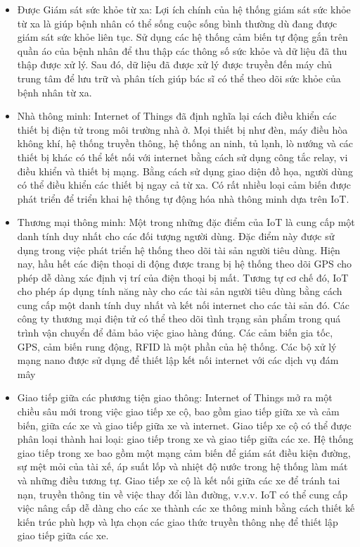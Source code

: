 \documentclass{article} %
\begin{document}
	\begin{itemize}
		\item Được Giám sát sức khỏe từ xa: Lợi ích chính của hệ thống giám sát sức khỏe từ xa là giúp bệnh nhân có thể sống cuộc sống bình thường dù đang được giám sát sức khỏe liên tục. Sử dụng các hệ thống cảm biến tự động gắn trên quần áo của bệnh nhân để thu thập các thông số sức khỏe và dữ liệu đã thu thập được xử lý. Sau đó, dữ liệu đã được xử lý được truyền đến máy chủ trung tâm để lưu trữ và phân tích giúp bác sĩ có thể theo dõi sức khỏe của bệnh nhân từ xa.
		\item Nhà thông minh: Internet of Things đã định nghĩa lại cách điều khiển các thiết bị điện tử trong môi trường nhà ở. Mọi thiết bị như đèn, máy điều hòa không khí, hệ thống truyền thông, hệ thống an ninh, tủ lạnh, lò nướng và các thiết bị khác có thể kết nối với internet bằng cách sử dụng công tắc relay, vi điều khiển và thiết bị mạng. Bằng cách sử dụng giao diện đồ họa, người dùng có thể điều khiển các thiết bị ngay cả từ xa. Có rất nhiều loại cảm biến được phát triển để triển khai hệ thống tự động hóa nhà thông minh dựa trên IoT.
		\item Thương mại thông minh: Một trong những đặc điểm của IoT là cung cấp một danh tính duy nhất cho các đối tượng người dùng. Đặc điểm này được sử dụng trong việc phát triển hệ thống theo dõi tài sản người tiêu dùng. Hiện nay, hầu hết các điện thoại di động được trang bị hệ thống theo dõi GPS cho phép dễ dàng xác định vị trí của điện thoại bị mất. Tương tự cơ chế đó, IoT cho phép áp dụng tính năng này cho các tài sản người tiêu dùng bằng cách cung cấp một danh tính duy nhất và kết nối internet cho các tài sản đó. Các công ty thương mại điện tử có thể theo dõi tình trạng sản phẩm trong quá trình vận chuyển để đảm bảo việc giao hàng đúng. Các cảm biến gia tốc, GPS, cảm biến rung động, RFID là một phần của hệ thống. Các bộ xử lý mạng nano được sử dụng để thiết lập kết nối internet với các dịch vụ đám mây
		\item Giao tiếp giữa các phương tiện giao thông: Internet of Things mở ra một chiều sâu mới trong việc giao tiếp xe cộ, bao gồm giao tiếp giữa xe và cảm biến, giữa các xe và giao tiếp giữa xe và internet. Giao tiếp xe cộ có thể được phân loại thành hai loại: giao tiếp trong xe và giao tiếp giữa các xe. Hệ thống giao tiếp trong xe bao gồm một mạng cảm biến để giám sát điều kiện đường, sự mệt mỏi của tài xế, áp suất lốp và nhiệt độ nước trong hệ thống làm mát và những điều tương tự. Giao tiếp xe cộ là kết nối giữa các xe để tránh tai nạn, truyền thông tin về việc thay đổi làn đường, v.v.v. IoT có thể cung cấp việc nâng cấp dễ dàng cho các xe thành các xe thông minh bằng cách thiết kế kiến trúc phù hợp và lựa chọn các giao thức truyền thông nhẹ để thiết lập giao tiếp giữa các xe.

\end{itemize}
\end{document}
